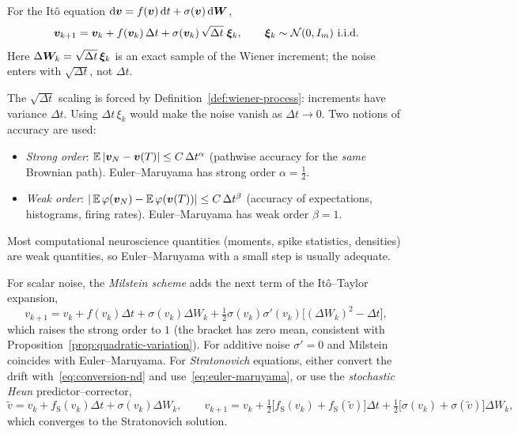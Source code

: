 \begin{definition}
\label{def:euler-maruyama}
For the It\^o equation $\mathrm{d}\bm{v}=f(\bm{v})\,\mathrm{d} t+\sigma(\bm{v})\,\mathrm{d}\bm{W}$,
\begin{equation}
\label{eq:euler-maruyama}
\bv_{k+1}=\bv_k+f(\bv_k)\,\Delta t+\sigma(\bv_k)\,\sqrt{\Delta t}\;\boldsymbol\xi_k,\qquad \boldsymbol\xi_k\sim\mathcal N(0,I_m)\ \text{i.i.d.}
\end{equation}
Here $\Delta\bm{W}_k=\sqrt{\Delta t}\,\boldsymbol\xi_k$ is an exact sample of the Wiener increment; the noise enters with $\sqrt{\Delta t}$, not $\Delta t$.
\end{definition}

\noindent The $\sqrt{\Delta t}$ scaling is forced by Definition~\ref{def:wiener-process}: increments have variance $\Delta t$. Using $\Delta t\,\xi_k$ would make the noise vanish as $\Delta t\to0$. Two notions of accuracy are used:
\begin{itemize}
\item \emph{Strong order}: $\operatorname{\mathbb{E}}|\bm{v}_N-\bm{v}(T)|\le C\,\Delta t^{\alpha}$ (pathwise accuracy for the \emph{same} Brownian path). Euler--Maruyama has strong order $\alpha=\tfrac12$.
\item \emph{Weak order}: $|\operatorname{\mathbb{E}}\varphi(\bm{v}_N)-\operatorname{\mathbb{E}}\varphi(\bm{v}(T))|\le C\,\Delta t^{\beta}$ (accuracy of expectations, histograms, firing rates). Euler--Maruyama has weak order $\beta=1$.
\end{itemize}
Most computational neuroscience quantities (moments, spike statistics, densities) are weak quantities, so Euler--Maruyama with a small step is usually adequate.

\begin{definition}
\label{def:milstein}
For scalar noise, the \emph{Milstein scheme} adds the next term of the It\^o--Taylor expansion,
\begin{equation}
\label{eq:milstein}
v_{k+1}=v_k+f(v_k)\Delta t+\sigma(v_k)\Delta W_k+\tfrac12\sigma(v_k)\sigma'(v_k)\big[(\Delta W_k)^2-\Delta t\big],
\end{equation}
which raises the strong order to $1$ (the bracket has zero mean, consistent with Proposition~\ref{prop:quadratic-variation}). For additive noise $\sigma'=0$ and Milstein coincides with Euler--Maruyama. For \emph{Stratonovich} equations, either convert the drift with~\eqref{eq:conversion-nd} and use~\eqref{eq:euler-maruyama}, or use the \emph{stochastic Heun} predictor--corrector,
\[
\tilde v=v_k+f_{\mathrm S}(v_k)\Delta t+\sigma(v_k)\Delta W_k,\qquad
v_{k+1}=v_k+\tfrac12\big[f_{\mathrm S}(v_k)+f_{\mathrm S}(\tilde v)\big]\Delta t+\tfrac12\big[\sigma(v_k)+\sigma(\tilde v)\big]\Delta W_k,
\]
which converges to the Stratonovich solution.
\end{definition}

